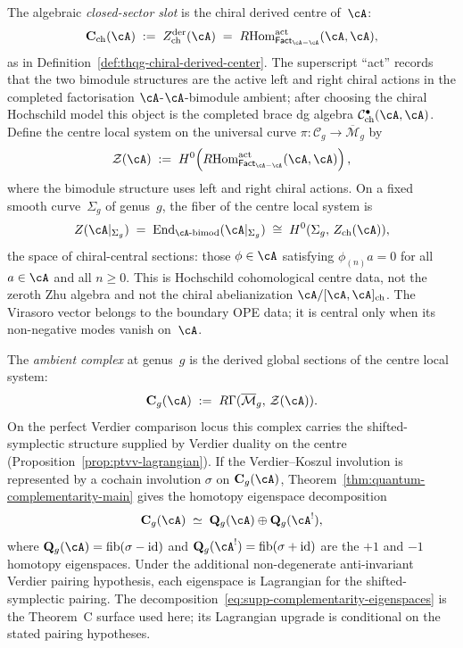 The algebraic \emph{closed-sector slot} is the chiral derived centre of~$\cA$:
\begin{equation}\label{eq:supp-chiral-derived-centre-def}
\mathbf{C}_{\mathrm{ch}}(\cA)
\;:=\;
Z^{\mathrm{der}}_{\mathrm{ch}}(\cA)
\;=\;
R\!\operatorname{Hom}^{\mathrm{act}}_{\mathsf{Fact}_{\cA-\cA}}
(\cA,\cA),
\end{equation}
as in Definition~\ref{def:thqg-chiral-derived-center}. The
superscript ``act'' records that the two bimodule structures are the
active left and right chiral actions in the completed factorisation
\(\cA\)-\(\cA\)-bimodule ambient; after choosing the chiral
Hochschild model this object is the completed brace dg algebra
\(\mathcal C^\bullet_{\mathrm{ch}}(\cA,\cA)\).
Define the centre local system on the universal curve
$\pi \colon \mathcal{C}_g \to \overline{\mathcal{M}}_g$ by
\begin{equation}\label{eq:supp-center-local-system-def}
\mathcal{Z}(\cA) \;:=\;
H^0\!\left(
R\!\operatorname{Hom}^{\mathrm{act}}_{\mathsf{Fact}_{\cA-\cA}}
(\cA,\cA)\right),
\end{equation}
where the bimodule structure uses left and right chiral actions.
On a fixed smooth curve~$\Sigma_g$ of genus~$g$, the fiber of the
centre local system is
\[
Z(\cA|_{\Sigma_g}) \;=\;
\operatorname{End}_{\cA\text{-bimod}}(\cA|_{\Sigma_g})
\;\cong\;
H^0(\Sigma_g,\, Z_{\mathrm{ch}}(\cA)),
\]
the space of chiral-central sections: those $\phi \in \cA$ satisfying
$\phi_{(n)} a = 0$ for all $a \in \cA$ and all $n \geq 0$. This is
Hochschild cohomological centre data, not the zeroth Zhu algebra and
not the chiral abelianization $\cA/[\cA,\cA]_{\mathrm{ch}}$. The
Virasoro vector belongs to the boundary OPE data; it is central only
when its non-negative modes vanish on~$\cA$.

The \emph{ambient complex} at genus~$g$ is the derived global sections
of the centre local system:
\begin{equation}\label{eq:supp-ambient-complex-def}
\mathbf{C}_g(\cA) \;:=\;
R\Gamma(\overline{\mathcal{M}}_g,\, \mathcal{Z}(\cA)).
\end{equation}
On the perfect Verdier comparison locus this complex carries the
shifted-symplectic structure supplied by Verdier duality on the centre
\textup{(}Proposition~\ref{prop:ptvv-lagrangian}\textup{)}. If the
Verdier--Koszul involution is represented by a cochain involution
$\sigma$ on $\mathbf{C}_g(\cA)$, Theorem~\ref{thm:quantum-complementarity-main}
gives the homotopy eigenspace decomposition
\begin{equation}\label{eq:supp-complementarity-eigenspaces}
\mathbf{C}_g(\cA)
\;\simeq\;
\mathbf{Q}_g(\cA) \oplus \mathbf{Q}_g(\cA^!),
\end{equation}
where $\mathbf{Q}_g(\cA) = \operatorname{fib}(\sigma - \mathrm{id})$
and $\mathbf{Q}_g(\cA^!) = \operatorname{fib}(\sigma + \mathrm{id})$
are the $+1$ and $-1$ homotopy eigenspaces. Under the additional
non-degenerate anti-invariant Verdier pairing hypothesis, each
eigenspace is Lagrangian for the shifted-symplectic pairing. The
decomposition~\eqref{eq:supp-complementarity-eigenspaces} is the
Theorem~C surface used here; its Lagrangian upgrade is conditional on
the stated pairing hypotheses.

